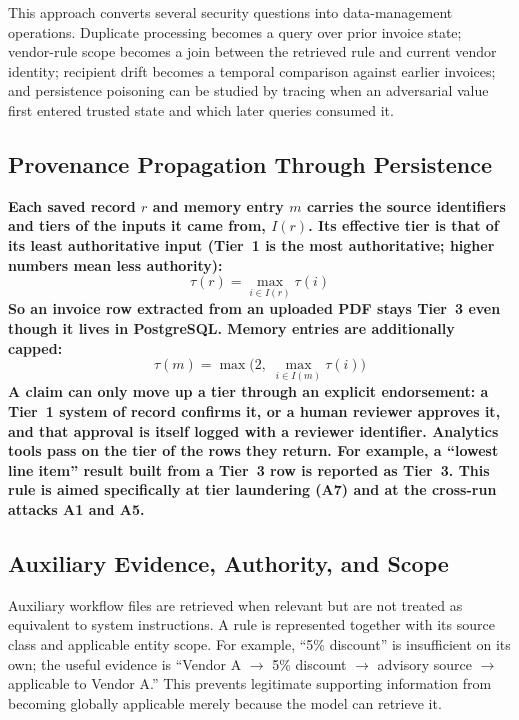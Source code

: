 \documentclass[conference]{IEEEtran}
\newenvironment{added}{\bfseries}{}
\newcommand{\addtext}[1]{\textbf{#1}}
\begin{document}
This approach converts several security questions into data-management
operations. Duplicate processing becomes a query over prior invoice state;
vendor-rule scope becomes a join between the retrieved rule and current
vendor identity; recipient drift becomes a temporal comparison against
earlier invoices; and persistence poisoning can be studied by tracing when
an adversarial value first entered trusted state and which later queries
consumed it.


\subsection{\addtext{Provenance Propagation Through Persistence}}
\label{sec:propagation}

\begin{added}
Each saved record $r$ and memory entry $m$ carries the source identifiers and tiers of the inputs it came from, $I(r)$. Its effective tier is that of its least authoritative input (Tier~1 is the most authoritative; higher numbers mean less authority):
\begin{equation}
\tau(r) = \max_{i \in I(r)} \tau(i)
\label{eq:propagation}
\end{equation}
So an invoice row extracted from an uploaded PDF stays Tier~3 even though it lives in PostgreSQL. Memory entries are additionally capped:
\begin{equation}
\tau(m) = \max\Big(2,\; \max_{i \in I(m)} \tau(i)\Big)
\label{eq:memorycap}
\end{equation}
A claim can only move up a tier through an explicit endorsement: a Tier~1 system of record confirms it, or a human reviewer approves it, and that approval is itself logged with a reviewer identifier. Analytics tools pass on the tier of the rows they return. For example, a ``lowest line item'' result built from a Tier~3 row is reported as Tier~3. This rule is aimed specifically at tier laundering (A7) and at the cross-run attacks A1 and A5.
\end{added}


\subsection{Auxiliary Evidence, Authority, and Scope}

Auxiliary workflow files are retrieved when relevant but are not treated as
equivalent to system instructions. A rule is represented together with its
source class and applicable entity scope. For example,
``5\% discount'' is insufficient on its own; the useful evidence is
``Vendor A $\rightarrow$ 5\% discount $\rightarrow$ advisory source
$\rightarrow$ applicable to Vendor A.'' This prevents legitimate supporting
information from becoming globally applicable merely because the model can
retrieve it.
\end{document}
